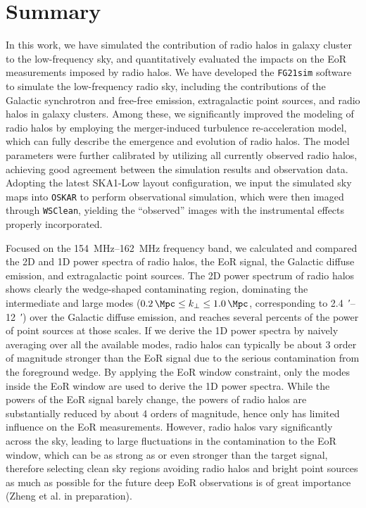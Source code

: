 \documentclass[modern]{aastex62}
\newcommand{\kperp}{\text{$k_{\bot}$}}
\begin{document}
\section{Summary}
\label{sec:summary}

In this work, we have simulated the contribution of radio halos in galaxy
cluster to the low-frequency sky, and quantitatively evaluated the impacts
on the EoR measurements imposed by radio halos.
We have developed the \texttt{FG21sim} software to simulate the low-frequency
radio sky, including the contributions of the Galactic synchrotron and
free-free emission, extragalactic point sources, and radio halos in
galaxy clusters.
Among these, we significantly improved the modeling of radio halos by
employing the merger-induced turbulence re-acceleration model, which can
fully describe the emergence and evolution of radio halos.
The model parameters were further calibrated by utilizing all currently
observed radio halos, achieving good agreement between the simulation
results and observation data.
Adopting the latest SKA1-Low layout configuration, we input the simulated
sky maps into \texttt{OSKAR} to perform observational simulation, which
were then imaged through \texttt{WSClean}, yielding the \enquote{observed}
images with the instrumental effects properly incorporated.

Focused on the \SIrange{154}{162}{\MHz} frequency band, we calculated
and compared the 2D and 1D power spectra of radio halos, the EoR signal,
the Galactic diffuse emission, and extragalactic point sources.
The 2D power spectrum of radio halos shows clearly the wedge-shaped
contaminating region, dominating the intermediate and large \kperp{}
modes ($\SI{0.2}{\per\Mpc} \leq \kperp \leq \SI{1.0}{\per\Mpc}$,
corresponding to \SIrange[range-units=repeat]{2.4}{12}{\arcminute})
over the Galactic diffuse emission, and reaches several percents of the
power of point sources at those scales.
If we derive the 1D power spectra by naively averaging over all the
available modes, radio halos can typically be about 3 order of magnitude
stronger than the EoR signal due to the serious contamination from the
foreground wedge.
By applying the EoR window constraint, only the modes inside the EoR
window are used to derive the 1D power spectra.
While the powers of the EoR signal barely change, the powers of radio
halos are substantially reduced by about 4 orders of magnitude, hence
only has limited influence on the EoR measurements.
However, radio halos vary significantly across the sky, leading to
large fluctuations in the contamination to the EoR window, which can be
as strong as or even stronger than the target signal, therefore
selecting clean sky regions avoiding radio halos and bright point sources
as much as possible for the future deep EoR observations is of great
importance (Zheng et al. in preparation).
\end{document}
